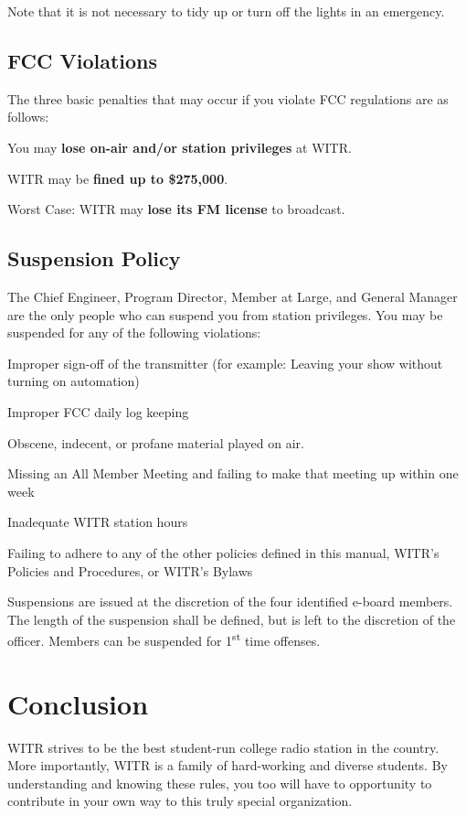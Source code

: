 \documentclass{witrman}
\begin{document}
Note that it is not necessary to tidy up or turn off the lights in an emergency.

\section{FCC Violations}
The three basic penalties that may occur if you violate FCC regulations are as
follows:
\begin{skinnyenumerate}
    \item You may \textbf{lose on-air and/or station privileges} at WITR.
    \item WITR may be \textbf{fined up to \$275,000}.
    \item Worst Case: WITR may \textbf{lose its FM license} to broadcast.
\end{skinnyenumerate}

\section{Suspension Policy}
The Chief Engineer, Program Director, Member at Large, and General Manager are
the only people who can suspend you from station privileges. You may be
suspended for any of the following violations:
\begin{skinnyitemize}
    \item Improper sign-off of the transmitter (for example: Leaving your show
        without turning on automation)
    \item Improper FCC daily log keeping
    \item Obscene, indecent, or profane material played on air.
    \item Missing an All Member Meeting and failing to make that meeting up
        within one week
    \item Inadequate WITR station hours
    \item Failing to adhere to any of the other policies defined in this manual,
        WITR’s Policies and Procedures, or WITR’s Bylaws
\end{skinnyitemize}

Suspensions are issued at the discretion of the four identified e-board members.
The length of the suspension shall be defined, but is left to the discretion of
the officer.  Members can be suspended for 1\textsuperscript{st} time offenses.

\pagebreak
\chapter{Conclusion}
WITR strives to be the best student-run college radio station in the country.
More importantly, WITR is a family of hard-working and diverse students. By
understanding and knowing these rules, you too will have to opportunity to
contribute in your own way to this truly special organization.

\vspace{0.5cm}
\end{document}
